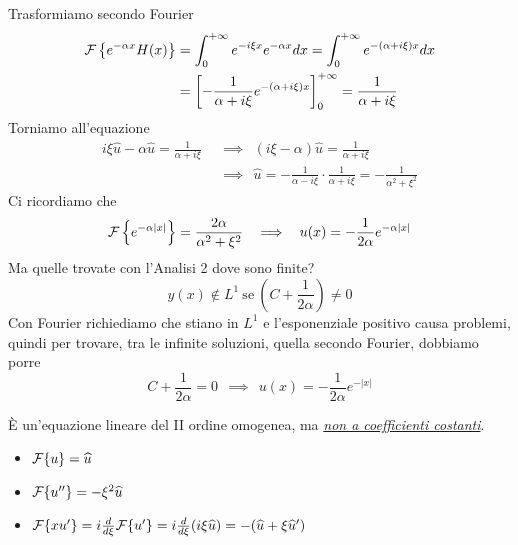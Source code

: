 Trasformiamo secondo Fourier
\begin{equation*}
\begin{aligned}
\mathcal{F} \left\{e^{-\alpha x} H( x)\right\} & =\int ^{+\infty }_{0} e^{-i\xi x} e^{-\alpha x} dx=\int ^{+\infty }_{0} e^{-( \alpha +i\xi ) x} dx\\
 & =\left[ -\frac{1}{\alpha +i\xi } e^{-( \alpha +i\xi ) x}\right]^{+\infty }_{0} =\frac{1}{\alpha +i\xi }
\end{aligned}
\end{equation*}
Torniamo all'equazione
\begin{equation*}
\begin{aligned}
i\xi \hat{u} -\alpha \hat{u} =\frac{1}{\alpha +i\xi } \ \  & \implies \ \ ( i\xi -\alpha )\hat{u} =\frac{1}{\alpha +i\xi }\\
 & \implies \ \ \hat{u} =-\frac{1}{\alpha -i\xi } \cdotp \frac{1}{\alpha +i\xi } =-\frac{1}{\alpha ^{2} +\xi ^{2}}
\end{aligned}
\end{equation*}
Ci ricordiamo che
\begin{equation*}
\mathcal{F} \left\{e^{-\alpha | x| }\right\} =\frac{2\alpha }{\alpha ^{2} +\xi ^{2}} \ \ \implies \ \ u( x) =-\frac{1}{2\alpha } e^{-\alpha | x| }
\end{equation*}
Ma quelle trovate con l'Analisi 2 dove sono finite?
\begin{equation*}
y( x) \notin L^{1} \ \text{se} \ \left( C+\frac{1}{2\alpha }\right) \neq 0
\end{equation*}
Con Fourier richiediamo che stiano in $L^{1}$ e l'esponenziale positivo causa problemi, quindi per trovare, tra le infinite soluzioni, quella secondo Fourier, dobbiamo porre
\begin{equation*}
C+\frac{1}{2\alpha } =0\ \ \implies \ \ u( x) =-\frac{1}{2\alpha } e^{-| x| }
\end{equation*}
\Soluzione

È un'equazione lineare del II ordine omogenea, ma \textit{\underline{non a coefficienti costanti}}.
\begin{itemize}
\item $\mathcal{F} \{u\} =\widehat{u}$
\item $\mathcal{F} \{u''\} =-\xi ^{2}\widehat{u}$
\item $\mathcal{F} \{xu'\} =i\frac{d}{d\xi }\mathcal{F} \{u'\} =i\frac{d}{d\xi }( i\xi \widehat{u}) =-(\widehat{u} +\xi \widehat{u} ')$
\end{itemize}

